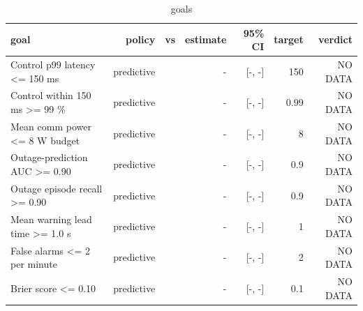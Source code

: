 \begin{table}[t]\centering\small
\begin{tabular}{lrrrrrr}\toprule
goal & policy & vs & estimate & 95\% CI & target & verdict \\\midrule
Control p99 latency <= 150 ms & predictive &  & - & [-, -] & 150 & NO DATA \\
Control within 150 ms >= 99 \% & predictive &  & - & [-, -] & 0.99 & NO DATA \\
Mean comm power <= 8 W budget & predictive &  & - & [-, -] & 8 & NO DATA \\
Outage-prediction AUC >= 0.90 & predictive &  & - & [-, -] & 0.9 & NO DATA \\
Outage episode recall >= 0.90 & predictive &  & - & [-, -] & 0.9 & NO DATA \\
Mean warning lead time >= 1.0 s & predictive &  & - & [-, -] & 1 & NO DATA \\
False alarms <= 2 per minute & predictive &  & - & [-, -] & 2 & NO DATA \\
Brier score <= 0.10 & predictive &  & - & [-, -] & 0.1 & NO DATA \\
\bottomrule\end{tabular}\caption{goals}\end{table}
